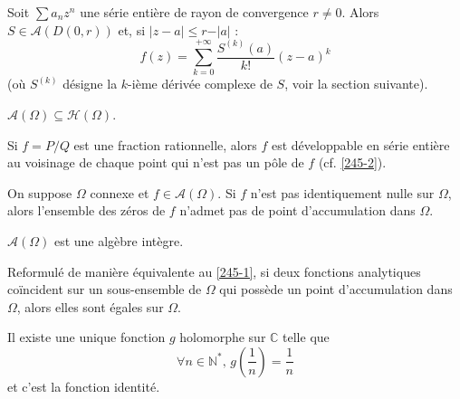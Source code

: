   \begin{proposition}
    Soit $\sum a_n z^n$ une série entière de rayon de convergence $r \neq 0$. Alors $S \in \mathcal{A}(D(0, r))$ et, si $\vert z - a \vert \leq r - \vert a \vert$ :
    \[ f(z) = \sum_{k=0}^{+\infty} \frac{S^{(k)}(a)}{k!} (z-a)^k \]
    (où $S^{(k)}$ désigne la $k$-ième dérivée complexe de $S$, voir la section suivante).
  \end{proposition}


  \begin{proposition}
    $\mathcal{A}(\Omega) \subseteq \mathcal{H}(\Omega)$.
  \end{proposition}


  \begin{proposition}
    Si $f = P/Q$ est une fraction rationnelle, alors $f$ est développable en série entière au voisinage de chaque point qui n'est pas un pôle de $f$ (cf. \cref{245-2}).
  \end{proposition}


  \begin{theorem}
    \label{245-1}
    On suppose $\Omega$ connexe et $f \in \mathcal{A}(\Omega)$. Si $f$ n'est pas identiquement nulle sur $\Omega$, alors l'ensemble des zéros de $f$ n'admet pas de point d'accumulation dans $\Omega$.
  \end{theorem}


  \begin{corollary}
    $\mathcal{A}(\Omega)$ est une algèbre intègre.
  \end{corollary}


  \begin{remark}
    Reformulé de manière équivalente au \cref{245-1}, si deux fonctions analytiques coïncident sur un sous-ensemble de $\Omega$ qui possède un point d'accumulation dans $\Omega$, alors elles sont égales sur $\Omega$.
  \end{remark}


  \begin{example}
    Il existe une unique fonction $g$ holomorphe sur $\mathbb{C}$ telle que
    \[ \forall n \in \mathbb{N}^*, \, g\left( \frac{1}{n} \right) = \frac{1}{n} \]
    et c'est la fonction identité.
  \end{example}

